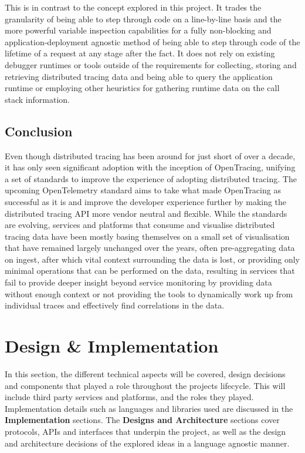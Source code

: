 \documentclass[12pt,pdftex,titlepage]{report}
\begin{document}
                This is in contrast to the concept explored in this project. It trades the granularity of being able to step through code on a line-by-line basis and
                the more powerful variable inspection capabilities for a fully non-blocking and application-deployment agnostic method of being able to step through code
                of the lifetime of a request at any stage after the fact. It does not rely on existing debugger runtimes or tools outside of the requirements for collecting,
                storing and retrieving distributed tracing data and being able to query the application runtime or employing other heuristics for gathering runtime data
                on the call stack information.
        
        \section{Conclusion}
            Even though distributed tracing has been around for just short of over a decade, it has only seen significant adoption with the inception of OpenTracing, unifying a set
            of standards to improve the experience of adopting distributed tracing. The upcoming OpenTelemetry standard aims to take what made OpenTracing as successful as it is and improve
            the developer experience further by making the distributed tracing API more vendor neutral and flexible. While the standards are evolving, services and platforms that consume
            and visualise distributed tracing data have been mostly basing themselves on a small set of visualisation that have remained largely unchanged over the years, often pre-aggregating
            data on ingest, after which vital context surrounding the data is lost, or providing only minimal operations that can be performed on the data, resulting in services that fail
            to provide deeper insight beyond service monitoring by providing data without enough context or not providing the tools to dynamically work up from individual traces and effectively
            find correlations in the data.
                    

    \chapter{Design \& Implementation}
        \small{In this section, the different technical aspects will be covered, design decisions and components that played a role throughout the projects lifecycle.
        This will include third party services and platforms, and the roles they played. Implementation details such as languages and libraries used are discussed in the
        \textbf{Implementation} sections. The \textbf{Designs and Architecture} sections cover protocols, APIs and interfaces that underpin the project, as well as the 
        design and architecture decisions of the explored ideas in a language agnostic manner.}
\end{document}
